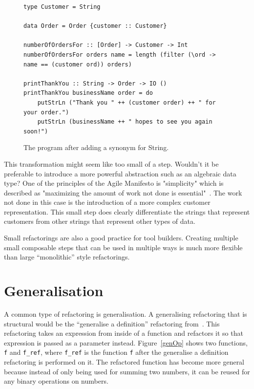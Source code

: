 \begin{figure}[t]
	\begin{lstlisting}
type Customer = String

data Order = Order {customer :: Customer}

numberOfOrdersFor :: [Order] -> Customer -> Int
numberOfOrdersFor orders name = length (filter (\ord -> name == (customer ord)) orders)

printThankYou :: String -> Order -> IO ()
printThankYou businessName order = do
	putStrLn ("Thank you " ++ (customer order) ++ " for your order.")
	putStrLn (businessName ++ " hopes to see you again soon!")
	\end{lstlisting}
	\caption{The program after adding a synonym for String.}\label{orderRefact}
\end{figure}

 This transformation might seem like too small of a step. Wouldn't it be preferable to introduce a more powerful abstraction such as an algebraic data type? One of the principles of the Agile Manifesto is "simplicity" which is described as "maximizing the amount of work not done is essential"~\citep{agileManifesto}. The work not done in this case is the introduction of a more complex customer representation. This small step does clearly differentiate the strings that represent customers from other strings that represent other types of data.
 
Small refactorings are also a good practice for tool builders. Creating multiple small composable steps that can be used in multiple ways is much more flexible than large ``monolithic'' style refactorings.


\section{Generalisation}
\label{genMaybe}

A common type of refactoring is generalisation. A generalising refactoring that is structural would be the ``generalise a definition'' refactoring from~\citep{huiqingThesis}. This refactoring takes an expression from inside of a function and refactors it so that expression is passed as a parameter instead. Figure~\ref{genOp} shows two functions, \texttt{f} and \texttt{f\_ref}, where \texttt{f\_ref} is the function \texttt{f} after the generalise a definition refactoring is performed on it. The refactored function has become more general because instead of only being used for summing two numbers, it can be reused for any binary operations on numbers. 

